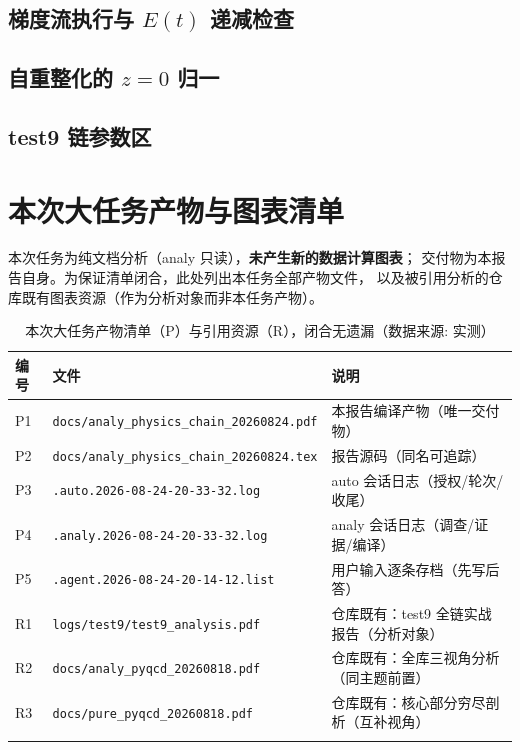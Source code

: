 \documentclass[UTF8]{ctexart}
\begin{document}
\subsection{梯度流执行与 $E(t)$ 递减检查}


\subsection{自重整化的 $z=0$ 归一}


\subsection{test9 链参数区}


\section{本次大任务产物与图表清单}

本次任务为纯文档分析（analy 只读），\textbf{未产生新的数据计算图表}；
交付物为本报告自身。为保证清单闭合，此处列出本任务全部产物文件，
以及被引用分析的仓库既有图表资源（作为分析对象而非本任务产物）。

\begin{xltabular}{\textwidth}{llX}
\toprule
编号 & 文件 & 说明 \\
\midrule
\endhead
P1 & \texttt{\nolinkurl{docs/analy_physics_chain_20260824.pdf}} & 本报告编译产物（唯一交付物） \\
P2 & \texttt{\nolinkurl{docs/analy_physics_chain_20260824.tex}} & 报告源码（同名可追踪） \\
P3 & \texttt{\nolinkurl{.auto.2026-08-24-20-33-32.log}} & auto 会话日志（授权/轮次/收尾） \\
P4 & \texttt{\nolinkurl{.analy.2026-08-24-20-33-32.log}} & analy 会话日志（调查/证据/编译） \\
P5 & \texttt{\nolinkurl{.agent.2026-08-24-20-14-12.list}} & 用户输入逐条存档（先写后答） \\
R1 & \texttt{\nolinkurl{logs/test9/test9_analysis.pdf}} & 仓库既有：test9 全链实战报告（分析对象） \\
R2 & \texttt{\nolinkurl{docs/analy_pyqcd_20260818.pdf}} & 仓库既有：全库三视角分析（同主题前置） \\
R3 & \texttt{\nolinkurl{docs/pure_pyqcd_20260818.pdf}} & 仓库既有：核心部分穷尽剖析（互补视角） \\
\bottomrule
\caption{本次大任务产物清单（P）与引用资源（R），闭合无遗漏（数据来源: 实测）}
\end{xltabular}
\end{document}
